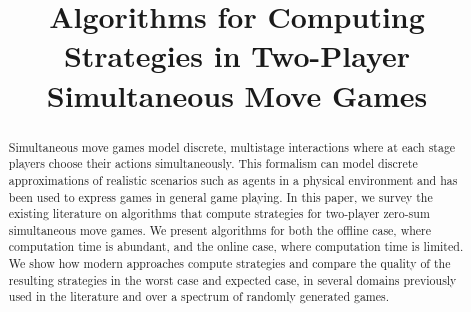 \documentclass[preprint,12pt]{elsarticle}
\begin{document}
\begin{frontmatter}



\title{Algorithms for Computing Strategies in Two-Player Simultaneous Move Games}


\author{}

\address{}

\begin{abstract}
Simultaneous move games model discrete, multistage interactions where at each stage 
players choose their actions simultaneously. This formalism can model discrete 
approximations of realistic scenarios such as agents in a physical environment and 
has been used to express games in general game playing. 
In this paper, we survey the existing literature on algorithms that compute strategies
for two-player zero-sum simultaneous move games.
We present algorithms for both the offline case, where computation time is abundant, and 
the online case, where computation time is limited. 
We show how modern approaches compute strategies and compare the quality of the resulting
strategies in the worst case and expected case, in several 
domains previously used in the literature and over a spectrum of randomly generated games. 
\end{abstract}

\begin{keyword}


\end{keyword}

\end{frontmatter}
\end{document}
